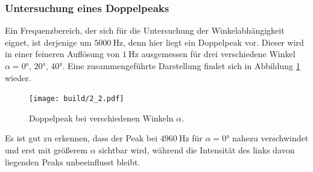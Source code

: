 \subsubsection{Untersuchung eines Doppelpeaks}
Ein Frequenzbereich, der sich für die Untersuchung der Winkelabhängigkeit eignet, ist derjenige um $\SI{5000}{\hertz}$, denn hier liegt ein Doppelpeak vor. Dieser wird in einer feineren Auflösung von $\SI{1}{\hertz}$ ausgemessen für drei verschiedene Winkel $\alpha=$0°, 20°, 40°. Eine zusammengeführte Darstellung findet sich in Abbildung \ref{fig:2_8} wieder.
\begin{figure}
  \centering
  \texttt{[image: build/2\_2.pdf]}  \caption{Doppelpeak bei verschiedenen Winkeln $\alpha$.} \label{fig:2_8}
\end{figure}
Es ist gut zu erkennen, dass der Peak bei $\SI{4960}{\hertz}$ für $\alpha=$0° nahezu verschwindet und erst mit größerem $\alpha$ sichtbar wird, während die Intensität des links davon liegenden Peaks unbeeinflusst bleibt.

